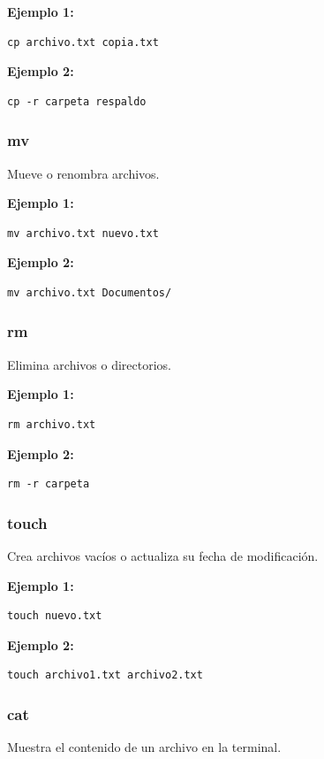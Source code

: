\documentclass[12pt,a4paper]{article}
\begin{document}
\textbf{Ejemplo 1:}
\begin{lstlisting}
cp archivo.txt copia.txt
\end{lstlisting}

\textbf{Ejemplo 2:}
\begin{lstlisting}
cp -r carpeta respaldo
\end{lstlisting}

\subsubsection{mv}
Mueve o renombra archivos.

\textbf{Ejemplo 1:}
\begin{lstlisting}
mv archivo.txt nuevo.txt
\end{lstlisting}

\textbf{Ejemplo 2:}
\begin{lstlisting}
mv archivo.txt Documentos/
\end{lstlisting}

\subsubsection{rm}
Elimina archivos o directorios.

\textbf{Ejemplo 1:}
\begin{lstlisting}
rm archivo.txt
\end{lstlisting}

\textbf{Ejemplo 2:}
\begin{lstlisting}
rm -r carpeta
\end{lstlisting}

\subsubsection{touch}
Crea archivos vacíos o actualiza su fecha de modificación.

\textbf{Ejemplo 1:}
\begin{lstlisting}
touch nuevo.txt
\end{lstlisting}

\textbf{Ejemplo 2:}
\begin{lstlisting}
touch archivo1.txt archivo2.txt
\end{lstlisting}

\subsubsection{cat}
Muestra el contenido de un archivo en la terminal.
\end{document}
